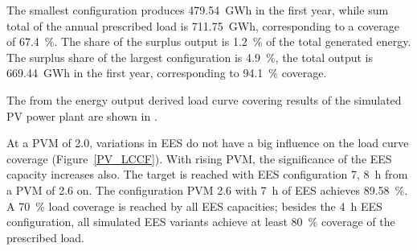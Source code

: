
The smallest configuration produces \SI{479.54}{GWh} in the first year, while sum total of the annual prescribed load is \SI{711.75}{GWh}, corresponding to a coverage of \SI{67.4}{\percent}. The share of the surplus output is \SI{1.2}{\percent} of the total generated energy. The surplus share of the largest configuration is \SI{4.9}{\percent}, the total output is \SI{669.44}{GWh} in the first year, corresponding to \SI{94.1}{\percent} coverage.


The from the energy output derived load curve covering results of the simulated PV power plant are shown in .

At a PVM of \num{2.0}, variations in EES do not have a big influence on the load curve coverage (Figure~\ref{PV_LCCF}). With rising PVM, the significance of the EES capacity increases also. The target is reached with EES configuration 7, \SI{8}{h} from a PVM of 2.6 on. The configuration PVM \num{2.6} with \SI{7}{h} of EES achieves \SI{89.58}{\percent}. A \SI{70}{\percent} load coverage is reached by all EES capacities; besides the \SI{4}{h} EES configuration, all simulated EES variants achieve at least \SI{80}{\percent} coverage of the prescribed load. 


